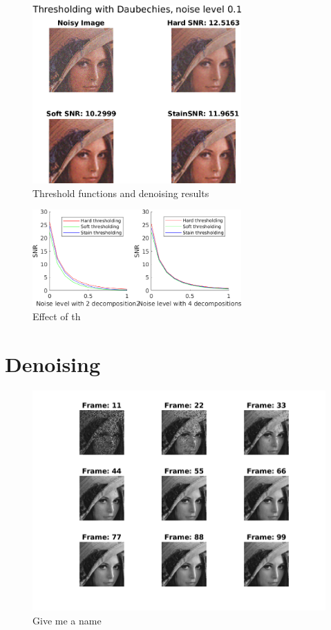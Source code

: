 \documentclass[a4paper,12pt]{article}
\begin{document}
\begin{figure}[t]
        \centering
        \includegraphics[width=8cm]{../Results/leana_threshold.png}
        \caption{Threshold functions and denoising results}
		\label{fig:threshold}
\end{figure}


\begin{figure}[t]
        \centering
        \includegraphics[width=8cm]{../Results/noise_levels.png}
        \caption{Effect of th}
		\label{fig:noiselevel}
\end{figure}


\section{Denoising}
\begin{figure}[t]
        \centering
        \includegraphics{../Videos/lena_primal_frames.png}
        \caption{Give me a name} 
		\label{fig:denoise_video}
\end{figure}
\end{document}
